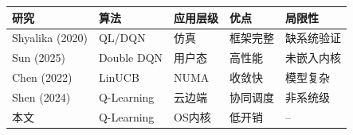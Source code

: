 \begin{tabularx}{\textwidth}{l l l X X}
\toprule
研究 & 算法 & 应用层级 & 优点 & 局限性 \\
\midrule
Shyalika (2020) & QL/DQN & 仿真 & 框架完整 & 缺系统验证 \\
Sun (2025) & Double DQN & 用户态 & 高性能 & 未嵌入内核 \\
Chen (2022) & LinUCB & NUMA & 收敛快 & 模型复杂 \\
Shen (2024) & Q-Learning & 云边端 & 协同调度 & 非系统级 \\
本文 & Q-Learning & OS内核 & 低开销 & -- \\
\bottomrule
\end{tabularx}
